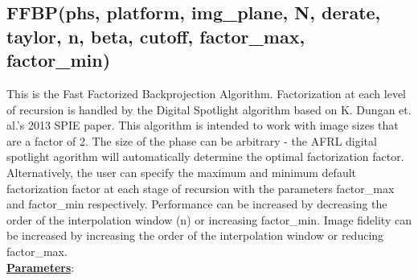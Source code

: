 \documentclass{article}
\begin{document}
\subsection{FFBP(phs, platform, img\_plane, N, derate, taylor, n, beta, cutoff, factor\_max, factor\_min)}
\label{sec:FFBP}
This is the Fast Factorized Backprojection Algorithm.  Factorization at each level of recursion is handled by the Digital Spotlight algorithm based on K. Dungan et. al.'s 2013 SPIE paper.  This algorithm is intended to work with image sizes that are a factor of 2.  The size of the phase can be arbitrary - the AFRL digital spotlight agorithm will automatically determine the optimal factorization factor.  Alternatively, the user can specify the maximum and minimum default factorization factor at each stage of recursion with the parameters factor\_max and factor\_min respectively.  Performance can be increased by decreasing the order of the interpolation window (n) or increasing factor\_min.  Image fidelity can be increased by increasing the order of the interpolation window or reducing factor\_max.\\

\noindent \underline{\textbf{Parameters}}:
\end{document}
